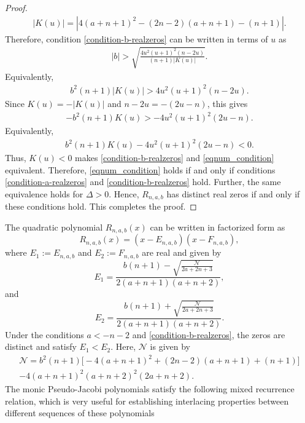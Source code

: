 \documentclass[final,3p,times,12pt]{elsarticle}
\numberwithin{equation}{section}  %
\begin{document}
\begin{proof}
\begin{align*}
		|K(u)|=	\left|	4(a+n+1)^2	-(2n-2)(a+n+1)-(n+1)\right|.
	\end{align*}
	Therefore, condition \eqref{condition-b-realzeros} can be written in terms of $u$ as
	\begin{align*}
	|b|	>\sqrt{	\frac{4u^2(u+1)^2(n-2u)}	{(n+1)|K(u)|}	}.
	\end{align*}
	Equivalently,
	\begin{align*}
		b^2(n+1)|K(u)|	>	4u^2(u+1)^2(n-2u).
	\end{align*}
	Since $K(u)=-|K(u)|$ and $n-2u=-(2u-n)$, this gives
	\begin{align*}
		-b^2(n+1)K(u)	>	-4u^2(u+1)^2(2u-n).
	\end{align*}
	Equivalently,
	\begin{align*}
		b^2(n+1)K(u)	-	4u^2(u+1)^2(2u-n)	< 0.
	\end{align*}
	Thus, $K(u)<0$ makes \eqref{condition-b-realzeros} and \eqref{eqnum_condition} equivalent. Therefore, \eqref{eqnum_condition}  holds if and only if conditions \eqref{condition-a-realzeros}  and \eqref{condition-b-realzeros} hold. Further, the same equivalence holds for $\Delta>0$. Hence, $R_{n,a,b}$ has distinct real zeros if and only if these conditions hold. This completes the proof. 
\end{proof}

	
	The quadratic polynomial $R_{n,a,b}(x)$ can be written in factorized form as
	\begin{equation}\label{Factorized-quadratic-PJP}
	R_{n,a,b}(x) = (x - E_{n,a,b})(x - F_{n,a,b}),
	\end{equation}
	where $E_1:=E_{n,a,b}$ and $E_2:=F_{n,a,b}$ are  real and given by
	\begin{equation}\label{PJP-Factor1-responsible-Interlacing}
	E_1 = \frac{b(n+1) - \sqrt{\frac{\mathcal{N}}{2a+2n+3}}}{2(a+n+1)(a+n+2)},
	\end{equation}
	and
	\begin{equation}\label{PJP-Factor2-responsible-Interlacing}
	E_2 = \frac{b(n+1) + \sqrt{\frac{\mathcal{N}}{2a+2n+3}}}{2(a+n+1)(a+n+2)}.
	\end{equation}
	Under the conditions $a<-n-2$ and \eqref{condition-b-realzeros},
the zeros are distinct and satisfy $E_1<E_2$.
	\noindent Here,  $\mathcal{N}$ is given by
	\begin{multline*}
	\mathcal{N} = b^2(n+1) \Big[ -4(a+n+1)^2 + (2n-2)(a+n+1) + (n+1) \Big] \\
	- 4(a+n+1)^2 (a+n+2)^2 (2a+n+2).
	\end{multline*}
	The monic Pseudo-Jacobi polynomials satisfy the following mixed recurrence relation, which is very useful for establishing interlacing properties between different sequences of these polynomials
	
\end{document}
